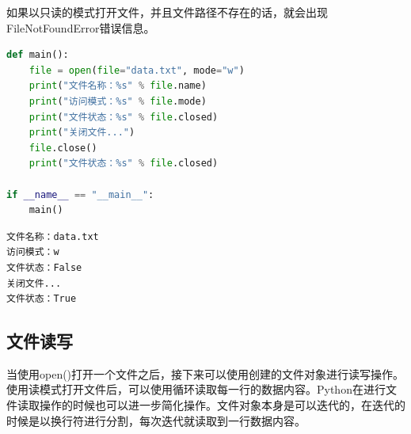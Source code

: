 如果以只读的模式打开文件，并且文件路径不存在的话，就会出现FileNotFoundError错误信息。 \\


\begin{lstlisting}[language=Python]
def main():
    file = open(file="data.txt", mode="w")
    print("文件名称：%s" % file.name)
    print("访问模式：%s" % file.mode)
    print("文件状态：%s" % file.closed)
    print("关闭文件...")
    file.close()
    print("文件状态：%s" % file.closed)

if __name__ == "__main__":
    main()
\end{lstlisting}

\begin{tcolorbox}
	\begin{verbatim}
文件名称：data.txt
访问模式：w
文件状态：False
关闭文件...
文件状态：True
	\end{verbatim}
\end{tcolorbox}

\subsection{文件读写}

当使用open()打开一个文件之后，接下来可以使用创建的文件对象进行读写操作。 \\

使用读模式打开文件后，可以使用循环读取每一行的数据内容。Python在进行文件读取操作的时候也可以进一步简化操作。文件对象本身是可以迭代的，在迭代的时候是以换行符进行分割，每次迭代就读取到一行数据内容。

